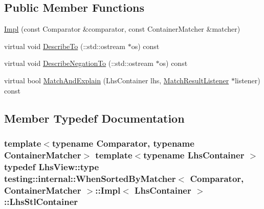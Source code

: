 \subsection*{Public Member Functions}
\begin{DoxyCompactItemize}
\item 
\hyperlink{classtesting_1_1internal_1_1_when_sorted_by_matcher_1_1_impl_a63235e98dec5478b7ff9d06f6babc716}{Impl} (const Comparator \&comparator, const Container\+Matcher \&matcher)
\item 
virtual void \hyperlink{classtesting_1_1internal_1_1_when_sorted_by_matcher_1_1_impl_a1550eab3f77ff48b54d7a0d33a9d8f31}{Describe\+To} (\+::std\+::ostream $\ast$os) const 
\item 
virtual void \hyperlink{classtesting_1_1internal_1_1_when_sorted_by_matcher_1_1_impl_af484d525e5dc6c3ba48c57f0c3696b54}{Describe\+Negation\+To} (\+::std\+::ostream $\ast$os) const 
\item 
virtual bool \hyperlink{classtesting_1_1internal_1_1_when_sorted_by_matcher_1_1_impl_af63d23e035f9938be00fb3bb56977ee6}{Match\+And\+Explain} (Lhs\+Container lhs, \hyperlink{classtesting_1_1_match_result_listener}{Match\+Result\+Listener} $\ast$listener) const 
\end{DoxyCompactItemize}


\subsection{Member Typedef Documentation}
\subsubsection[{\texorpdfstring{Lhs\+Stl\+Container}{LhsStlContainer}}]{\setlength{\rightskip}{0pt plus 5cm}template$<$typename Comparator, typename Container\+Matcher$>$ template$<$typename Lhs\+Container $>$ typedef {\bf Lhs\+View\+::type} {\bf testing\+::internal\+::\+When\+Sorted\+By\+Matcher}$<$ Comparator, Container\+Matcher $>$\+::{\bf Impl}$<$ Lhs\+Container $>$\+::{\bf Lhs\+Stl\+Container}}\hypertarget{classtesting_1_1internal_1_1_when_sorted_by_matcher_1_1_impl_a2cb1a8d85ca2c376b6abdbcb00d84759}{}\label{classtesting_1_1internal_1_1_when_sorted_by_matcher_1_1_impl_a2cb1a8d85ca2c376b6abdbcb00d84759}
